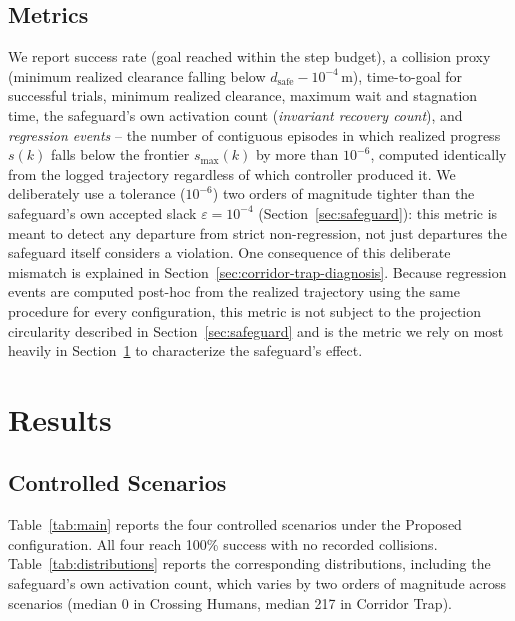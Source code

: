 \documentclass[conference,letterpaper,10pt]{ieeeconf}
\begin{document}
\subsection{Metrics}
We report success rate (goal reached within the step budget), a collision
proxy (minimum realized clearance falling below \(d_{\text{safe}} -
10^{-4}\)\,m), time-to-goal for successful trials, minimum realized
clearance, maximum wait and stagnation time, the safeguard's own
activation count (\emph{invariant recovery count}), and \emph{regression
events} -- the number of contiguous episodes in which realized progress
\(s(k)\) falls below the frontier \(s_{\max}(k)\) by more than
\(10^{-6}\), computed identically from the logged trajectory regardless of
which controller produced it. We deliberately use a tolerance
($10^{-6}$) two orders of magnitude tighter than the safeguard's own
accepted slack $\varepsilon = 10^{-4}$ (Section~\ref{sec:safeguard}): this
metric is meant to detect any departure from strict non-regression, not
just departures the safeguard itself considers a violation. One
consequence of this deliberate mismatch is explained in
Section~\ref{sec:corridor-trap-diagnosis}. Because regression events are
computed post-hoc from the realized trajectory using the same procedure
for every configuration, this metric is not subject to the projection
circularity described in Section~\ref{sec:safeguard} and is the metric we
rely on most heavily in Section~\ref{sec:results} to characterize the
safeguard's effect.

\section{Results}
\label{sec:results}

\subsection{Controlled Scenarios}
Table~\ref{tab:main} reports the four controlled scenarios under the
Proposed configuration. All four reach 100\% success with no recorded
collisions. Table~\ref{tab:distributions} reports the corresponding
distributions, including the safeguard's own activation count, which
varies by two orders of magnitude across scenarios (median 0 in Crossing
Humans, median 217 in Corridor Trap).



\end{document}
